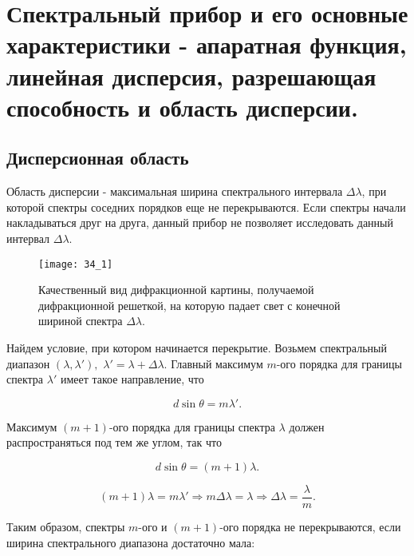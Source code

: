 \section{Спектральный прибор и его основные характеристики - апаратная функция, линейная дисперсия, разрешающая способность и область дисперсии.}





\subsection{Дисперсионная область}




Область дисперсии - максимальная ширина спектрального интервала $\Delta \lambda$, при которой спектры соседних порядков еще не перекрываются. Если спектры начали накладываться друг на друга, данный прибор не позволяет исследовать данный интервал $\Delta \lambda$.

\begin{figure}[h!]
    \centering
    \texttt{[image: 34\_1]}
    \caption{Качественный вид дифракционной картины, получаемой дифракционной решеткой, на которую падает свет с конечной шириной спектра $\Delta\lambda$.}
    \label{fig:my_label}
\end{figure} 

Найдем условие, при котором начинается перекрытие. Возьмем спектральный диапазон $(\lambda,\lambda'), $  $\lambda' = \lambda  + \Delta \lambda.$  Главный максимум $m$-ого порядка для границы спектра $\lambda' $ имеет такое направление, что

\begin{equation*}
    d\sin\theta = m\lambda'.
\end{equation*}

Максимум $(m+1)$-ого порядка для границы спектра $\lambda$ должен распространяться под тем же углом, так что

\begin{equation*}
    d\sin\theta = (m+1)\lambda.
\end{equation*}

\begin{equation*}
    (m+1)\lambda = m\lambda' \Rightarrow m\Delta\lambda = \lambda \Rightarrow \Delta\lambda = \frac{\lambda}{m}.
\end{equation*}

Таким образом, спектры $m$-ого и $(m+1)$-ого порядка не перекрываются, если ширина спектрального диапазона достаточно мала:

